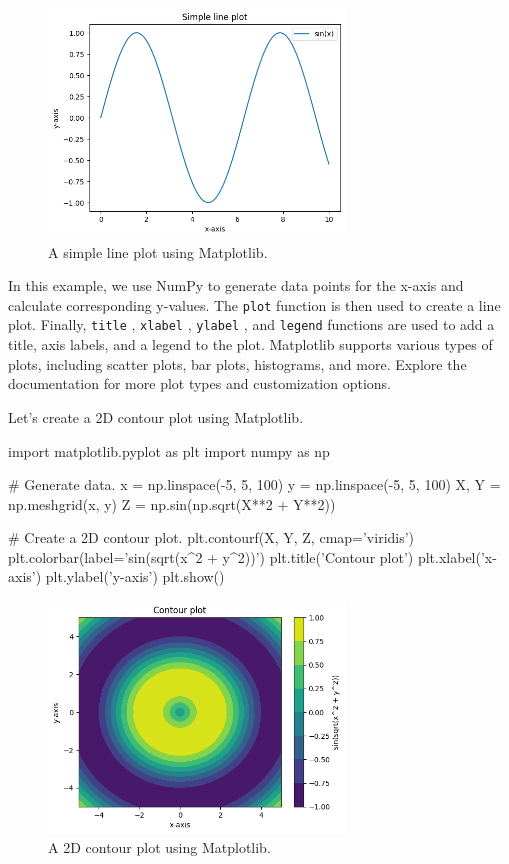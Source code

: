 \begin{figure}[H]
    \centering
    \includegraphics[width=0.7\textwidth]{assets/fig1_mpl.png}
    \caption{A simple line plot using Matplotlib.}
\end{figure}

In this example, we use NumPy to generate data points for the x-axis and calculate corresponding
y-values. The \texttt{plot} function is then used to create a line plot. Finally, \texttt{title} , \texttt{xlabel} , \texttt{ylabel} ,
and \texttt{legend} functions are used to add a title, axis labels, and a legend to the plot.
Matplotlib supports various types of plots, including scatter plots, bar plots, histograms, and more.
Explore the documentation for more plot types and customization options.

Let's create a 2D contour plot using Matplotlib.
\begin{codeblock}[language=python]
    import matplotlib.pyplot as plt
    import numpy as np

    # Generate data.
    x = np.linspace(-5, 5, 100)
    y = np.linspace(-5, 5, 100)
    X, Y = np.meshgrid(x, y)
    Z = np.sin(np.sqrt(X**2 + Y**2))

    # Create a 2D contour plot.
    plt.contourf(X, Y, Z, cmap='viridis')
    plt.colorbar(label='sin(sqrt(x^2 + y^2))')
    plt.title('Contour plot')
    plt.xlabel('x-axis')
    plt.ylabel('y-axis')
    plt.show()
\end{codeblock}

\begin{figure}[H]
    \centering
    \includegraphics[width=0.7\textwidth]{assets/fig2_mpl.png}
    \caption{A 2D contour plot using Matplotlib.}
\end{figure}

